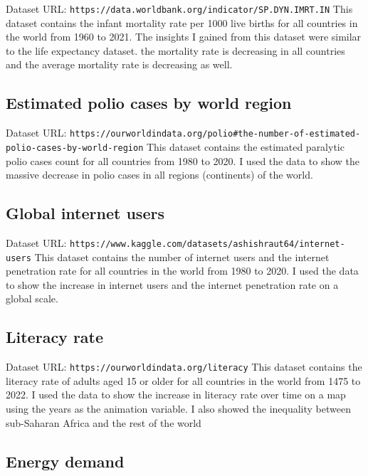 \documentclass{article}
\begin{document}
Dataset URL: \texttt{https://data.worldbank.org/indicator/SP.DYN.IMRT.IN} \newline
This dataset contains the infant mortality rate per 1000 live births for all countries in the world from 1960 to 2021.
The insights I gained from this dataset were similar to the life expectancy dataset.
the mortality rate is decreasing in all countries and the average mortality rate is decreasing as well.

\subsection{Estimated polio cases by world region}

Dataset URL: \texttt{https://ourworldindata.org/polio\#the-number-of-estimated-polio-cases-by-world-region} \newline
This dataset contains the estimated paralytic polio cases count for all countries from 1980 to 2020.
I used the data to show the massive decrease in polio cases in all regions (continents) of the world.

\subsection{Global internet users}

Dataset URL: \texttt{https://www.kaggle.com/datasets/ashishraut64/internet-users} \newline
This dataset contains the number of internet users and the internet penetration rate for all countries in the world from 1980 to 2020.
I used the data to show the increase in internet users and the internet penetration rate on a global scale.

\subsection{Literacy rate}

Dataset URL: \texttt{https://ourworldindata.org/literacy} \newline
This dataset contains the literacy rate of adults aged 15 or older for all countries in the world from 1475 to 2022.
I used the data to show the increase in literacy rate over time on a map using the years as the animation variable.
I also showed the inequality between sub-Saharan Africa and the rest of the world

\subsection{Energy demand}
\end{document}
